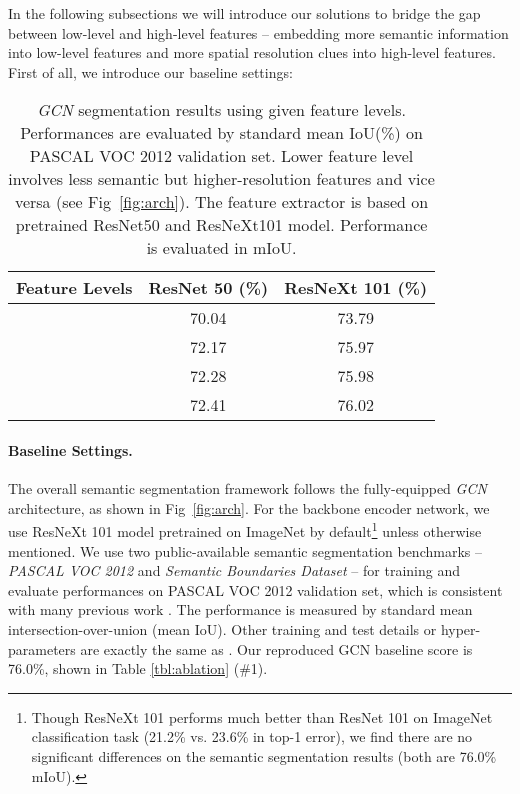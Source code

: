 \documentclass[runningheads]{llncs}
\begin{document}
In the following subsections we will introduce our solutions to bridge the gap between low-level and high-level features -- embedding more semantic information into low-level features and more spatial resolution clues into high-level features. First of all, we introduce our baseline settings:
\begin{table}

\begin{center}
\begin{tabular}{c|c|c}
\hline
Feature Levels & ResNet 50 (\%) & ResNeXt 101 (\%) \\
\hline  & 70.04 & 73.79 \\
\hline
 & 72.17& 75.97\\
\hline
 & 72.28& 75.98\\
\hline
 & 72.41& 76.02\\
\hline
\end{tabular}
\end{center}

\caption{\emph{GCN} \cite{Peng2017Large} segmentation results using given feature levels. Performances are evaluated by standard mean IoU(\%) on PASCAL VOC 2012 validation set. Lower feature level involves less semantic but higher-resolution features and vice versa (see Fig~\ref{fig:arch}). The feature extractor is based on pretrained ResNet50 \cite{He2016Deep} and ResNeXt101\cite{Xie2016Aggregated} model. Performance is evaluated in mIoU.}

\label{tbl:basicfusion}
\end{table}


\paragraph{Baseline Settings.} 
The overall semantic segmentation framework follows the fully-equipped \emph{GCN} \cite{Peng2017Large} architecture, as shown in Fig~\ref{fig:arch}. For the backbone encoder network, we use ResNeXt 101 \cite{Xie2016Aggregated} model pretrained on ImageNet by default\footnote{Though ResNeXt 101 performs much better than ResNet 101\cite{He2016Deep} on ImageNet classification task (21.2\% vs. 23.6\% in top-1 error), we find there are no significant differences on the semantic segmentation results (both are 76.0\% mIoU). } unless otherwise mentioned. We use two public-available semantic segmentation benchmarks -- \emph{PASCAL VOC 2012} \cite{Everingham2010The} and \emph{Semantic Boundaries Dataset} \cite{Hariharan2011Semantic} -- for training and evaluate performances on PASCAL VOC 2012 validation set, which is consistent with many previous work \cite{Chen2016DeepLab,Ghiasi2016Laplacian,Badrinarayanan2017SegNet,Yu2015Multi,Chen2017Rethinking,Islam_2017_CVPR,Peng2017Large,Wang2017Understanding,Zhao2016Pyramid,Long2015Fully,Lin2016RefineNet,Chen2014Semantic,Pohlen2016Full}. The performance is measured by standard mean intersection-over-union (mean IoU). Other training and test details or hyper-parameters are exactly the same as \cite{Peng2017Large}. Our reproduced GCN baseline score is 76.0\%, shown in Table \ref{tbl:ablation} (\#1).
\end{document}
